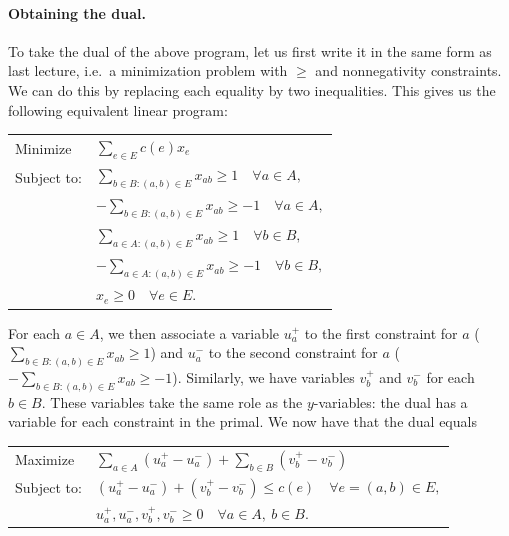 \paragraph{Obtaining the dual.} To take the dual of the above program, let us first write it in
the same form as last lecture, i.e.\ a minimization problem with $\ge$ and nonnegativity
constraints. We can do this by replacing each equality by two inequalities. This gives us the
following equivalent linear program:
\begin{center}
\begin{tabular}{ll}
  Minimize    & $\displaystyle\sum_{e\in E}c(e)x_e$\\[8pt]
  Subject to: & $\displaystyle\sum_{b\in B:(a,b)\in E}x_{ab}\ge 1\quad\forall a\in A,$\\[8pt]
              & $\displaystyle-\sum_{b\in B:(a,b)\in E}x_{ab}\ge -1\quad\forall a\in A,$\\[8pt]
              & $\displaystyle\sum_{a\in A:(a,b)\in E}x_{ab}\ge 1\quad\forall b\in B,$\\[8pt]
              & $\displaystyle-\sum_{a\in A:(a,b)\in E}x_{ab}\ge -1\quad\forall b\in B,$\\[8pt]
              & $x_e\ge 0\quad\forall e\in E.$
\end{tabular}
\end{center}
For each $a\in A$, we then associate a variable $u_a^+$ to the first constraint for $a$
($\sum_{b\in B:(a,b)\in E}x_{ab}\ge 1$) and $u_a^-$ to the second constraint for $a$
($-\sum_{b\in B:(a,b)\in E}x_{ab}\ge -1$). Similarly, we have variables $v_b^+$ and $v_b^-$ for
each $b\in B$. These variables take the same role as the $y$-variables: the dual has
a variable for each constraint in the primal. We now have that the dual equals
\begin{center}
\begin{tabular}{ll}
  Maximize    & $\displaystyle\sum_{a\in A}(u_a^+-u_a^-)+\sum_{b\in B}(v_b^+-v_b^-)$\\[8pt]
  Subject to: & $(u_a^+-u_a^-)+(v_b^+-v_b^-)\le c(e)\quad\forall e=(a,b)\in E,$\\[4pt]
              & $u_a^+,u_a^-,v_b^+,v_b^-\ge 0\quad\forall a\in A,\ b\in B.$
\end{tabular}
\end{center}

